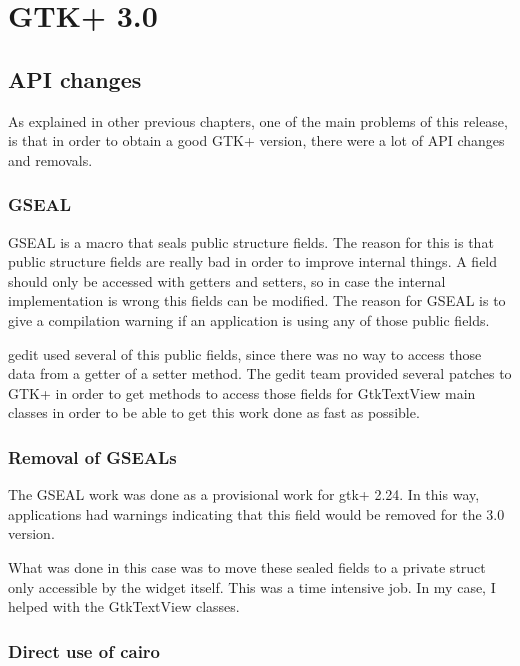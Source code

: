 

\chapter{GTK+ 3.0}\label{chap:GTK3}


\section{API changes}

As explained in other previous chapters, one of the main problems of this release, is that in order to obtain a good GTK+ version, there were a lot of API changes and removals.

\subsection{GSEAL}

GSEAL is a macro that seals public structure fields. The reason for this is that public structure fields are really bad 
in order to improve internal things. A field should only be accessed with getters and setters, so in case the internal 
implementation is wrong this fields can be modified. The reason for GSEAL is to give a compilation warning if an application 
is using any of those public fields.

gedit used several of this public fields, since there was no way to access those data from a getter of a setter method. 
The gedit team provided several patches to GTK+ in order to get methods to access those fields for GtkTextView main classes 
in order to be able to get this work done as fast as possible.

\subsection{Removal of GSEALs}

The GSEAL work was done as a provisional work for gtk+ 2.24.  In this way,  applications had warnings indicating that this field 
would be removed for the 3.0 version.

What was done in this case was to move these sealed fields to a private struct only accessible by the widget itself. 
This was a time intensive job. In my case, I helped with the GtkTextView classes.

\subsection{Direct use of cairo}

